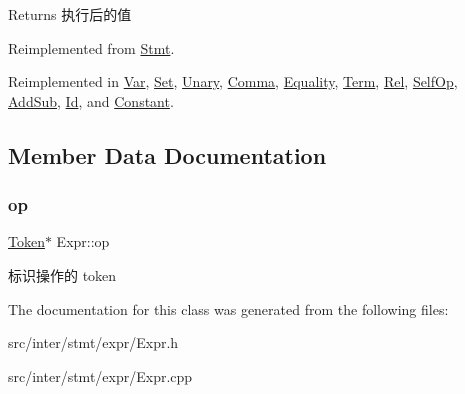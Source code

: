 \begin{DoxyReturn}{Returns}
执行后的值 
\end{DoxyReturn}


Reimplemented from \hyperlink{class_stmt_abdc3261770c3c5bd3ce5b3ba6eedfaa4}{Stmt}.



Reimplemented in \hyperlink{class_var_a9dc96e803f7b0f9aa519c2c0e0a6bd8f}{Var}, \hyperlink{class_set_a7776ba36f3af8b09772b36927beb5f5c}{Set}, \hyperlink{class_unary_af42edff1ee4718a9afeb7127e41af758}{Unary}, \hyperlink{class_comma_aab9ca2bb70a10abd2fb263de745f843a}{Comma}, \hyperlink{class_equality_a0255c33af70613b006b03a329ed329ff}{Equality}, \hyperlink{class_term_ac2d20115da73f9425e5d390856a211a1}{Term}, \hyperlink{class_rel_a82b2f3b75a2b9e81631f2659d42a36d1}{Rel}, \hyperlink{class_self_op_ab452bcad1cd4f1286813b1f737583818}{Self\+Op}, \hyperlink{class_add_sub_a73c0513a31a5400fdfc79ce877a1c3b9}{Add\+Sub}, \hyperlink{class_id_ae43a9ffecbbc0ac4fd041b8e8e3c3de0}{Id}, and \hyperlink{class_constant_ab5c55607bcff5ce70131a588b6bdbed7}{Constant}.



\subsection{Member Data Documentation}
\mbox{\label{class_expr_a5fd7721b7843686e3ec7e63fddf95644}} 
\subsubsection{\texorpdfstring{op}{op}}
{\footnotesize\ttfamily \hyperlink{class_token}{Token}$\ast$ Expr\+::op}

标识操作的 token 

The documentation for this class was generated from the following files\+:\begin{DoxyCompactItemize}
\item 
src/inter/stmt/expr/Expr.\+h\item 
src/inter/stmt/expr/Expr.\+cpp\end{DoxyCompactItemize}
